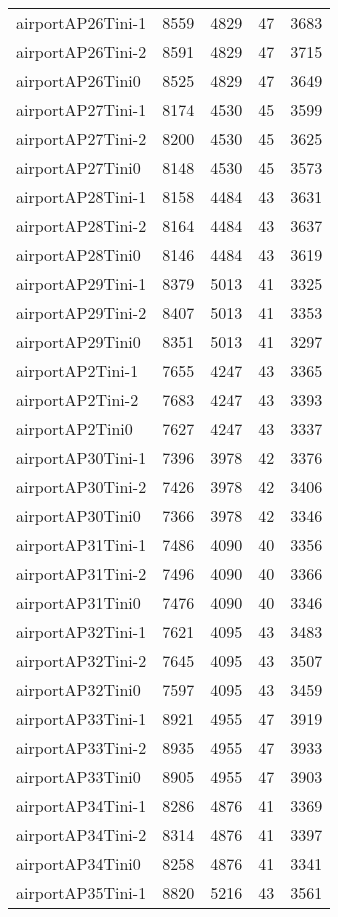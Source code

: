 \documentclass[../../../thesis.tex]{subfiles}
\begin{document}
\begin{longtable}{lrrrr}
airportAP26Tini-1 & 8559 & 4829 & 47 & 3683 \\
airportAP26Tini-2 & 8591 & 4829 & 47 & 3715 \\
airportAP26Tini0 & 8525 & 4829 & 47 & 3649 \\
airportAP27Tini-1 & 8174 & 4530 & 45 & 3599 \\
airportAP27Tini-2 & 8200 & 4530 & 45 & 3625 \\
airportAP27Tini0 & 8148 & 4530 & 45 & 3573 \\
airportAP28Tini-1 & 8158 & 4484 & 43 & 3631 \\
airportAP28Tini-2 & 8164 & 4484 & 43 & 3637 \\
airportAP28Tini0 & 8146 & 4484 & 43 & 3619 \\
airportAP29Tini-1 & 8379 & 5013 & 41 & 3325 \\
airportAP29Tini-2 & 8407 & 5013 & 41 & 3353 \\
airportAP29Tini0 & 8351 & 5013 & 41 & 3297 \\
airportAP2Tini-1 & 7655 & 4247 & 43 & 3365 \\
airportAP2Tini-2 & 7683 & 4247 & 43 & 3393 \\
airportAP2Tini0 & 7627 & 4247 & 43 & 3337 \\
airportAP30Tini-1 & 7396 & 3978 & 42 & 3376 \\
airportAP30Tini-2 & 7426 & 3978 & 42 & 3406 \\
airportAP30Tini0 & 7366 & 3978 & 42 & 3346 \\
airportAP31Tini-1 & 7486 & 4090 & 40 & 3356 \\
airportAP31Tini-2 & 7496 & 4090 & 40 & 3366 \\
airportAP31Tini0 & 7476 & 4090 & 40 & 3346 \\
airportAP32Tini-1 & 7621 & 4095 & 43 & 3483 \\
airportAP32Tini-2 & 7645 & 4095 & 43 & 3507 \\
airportAP32Tini0 & 7597 & 4095 & 43 & 3459 \\
airportAP33Tini-1 & 8921 & 4955 & 47 & 3919 \\
airportAP33Tini-2 & 8935 & 4955 & 47 & 3933 \\
airportAP33Tini0 & 8905 & 4955 & 47 & 3903 \\
airportAP34Tini-1 & 8286 & 4876 & 41 & 3369 \\
airportAP34Tini-2 & 8314 & 4876 & 41 & 3397 \\
airportAP34Tini0 & 8258 & 4876 & 41 & 3341 \\
airportAP35Tini-1 & 8820 & 5216 & 43 & 3561 \\

\end{longtable}
\end{document}

